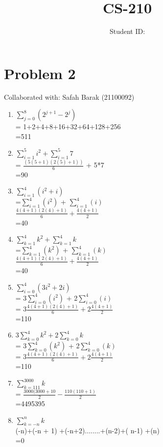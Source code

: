 \documentclass{article}
\title{CS-210 \hwNo}
\author{\myname \qquad Student ID: \myid}
\begin{document}
\maketitle

\section{Problem 2}
Collaborated with: Safah Barak (21100092)\\
\begin{enumerate}
\item %
$\sum_{j = 0}^{8} (2^{j +1} - 2^j)$ \\ = 1+2+4+8+16+32+64+128+256 \\ =511 \\

\item %
$\sum\limits_{i=1}^5 i^2 +\sum\limits_{i=1}^5 7$  \\ = $\frac{(5(5+1)(2(5)+1))}{6}$ + 5*7 \\ =90

\item %
$\sum\limits_{i=1}^4 (i^2+i)$ \\ =$\sum\limits_{i=1}^4 (i^2)$ + $\sum\limits_{i=1}^4 (i)$ \\ $\frac{4(4+1)(2(4)+1)}{6} + \frac{4(4+1)}{2}$  \\ =40

\item %
$\sum\limits_{k=1}^4 k^2 +\sum\limits_{k=1}^4 k$ \\ =$\sum\limits_{k=1}^4 (k^2)$ + $\sum\limits_{k=1}^4 (k)$ \\ $\frac{4(4+1)(2(4)+1)}{6} + \frac{4(4+1)}{2}$  \\ =40

\item %
$\sum\limits_{i=0}^4 (3i^2+2i)$ \\= 3$\sum\limits_{i=0}^4 (i^2)$ + 2$\sum\limits_{i=0}^4 (i)$ \\= 3$\frac{4(4+1)(2(4)+1)}{6} + 2\frac{4(4+1)}{2} $  \\ =110

\item %
$3\sum\limits_{k=0}^4 k^2 +2\sum\limits_{k=0}^4 k$ \\= 3$\sum\limits_{k=0}^4 (k^2)$ + 2$\sum\limits_{k=0}^4 (k)$ \\= 3$\frac{4(4+1)(2(4)+1)}{6} + 2\frac{4(4+1)}{2} $  \\ =110

\item %
$\sum\limits_{k= 111}^{3000} k$ \\= $\frac {3000(3000+10}{2}  - \frac{110(110+1)}{2}$ \\ =4495395

\item %
 $\sum\limits_{k=-n}^n k$ \\ (-n)+(-n + 1) +(-n+2)........+(n-2)+( n-1) +(n) \\=0
\end{enumerate}
\end{document}
